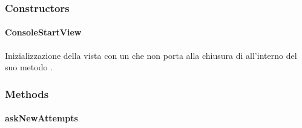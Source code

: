 \documentclass[letterpaper,10pt,italian,openany,oneside]{sphinxmanual}
\begin{document}
\subsubsection{Constructors}
\label{\detokenize{source/it/unicam/cs/pa/mastermind/ui/ConsoleStartView:constructors}}

\paragraph{ConsoleStartView}
\label{\detokenize{source/it/unicam/cs/pa/mastermind/ui/ConsoleStartView:id1}}

\begin{fulllineitems}
\label{\detokenize{source/it/unicam/cs/pa/mastermind/ui/ConsoleStartView:it.unicam.cs.pa.mastermind.ui.ConsoleStartView.ConsoleStartView()}}
Inizializzazione della vista con un  che non porta alla chiusura di  all’interno del suo metodo .

\end{fulllineitems}



\subsubsection{Methods}
\label{\detokenize{source/it/unicam/cs/pa/mastermind/ui/ConsoleStartView:methods}}

\paragraph{askNewAttempts}
\label{\detokenize{source/it/unicam/cs/pa/mastermind/ui/ConsoleStartView:asknewattempts}}

\begin{fulllineitems}
\label{\detokenize{source/it/unicam/cs/pa/mastermind/ui/ConsoleStartView:it.unicam.cs.pa.mastermind.ui.ConsoleStartView.askNewAttempts(int)}}
\end{fulllineitems}
\end{document}

